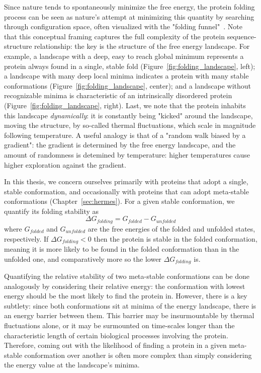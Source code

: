 Since nature tends to spontaneously minimize the free energy, the protein folding process can be seen as nature's attempt
at minimizing this quantity by searching through configuration space, often visualized with the "folding funnel"~\citep{onuchic_theory_1997}.
Note that this conceptual framing captures the full complexity of the protein sequence-structure relationship:
the key is the structure of the free energy landscape.
For example, a landscape with a deep, easy to reach global minimum represents a protein always found in a single, stable fold (Figure~\ref{fig:folding_landscape}, left);
a landscape with many deep local minima indicates a protein with many stable conformations (Figure~\ref{fig:folding_landscape}, center);
and a landscape without recognizable minima is characteristic of an intrinsically disordered protein (Figure~\ref{fig:folding_landscape}, right).
Last, we note that the protein inhabits this landscape \textit{dynamically}:
it is constantly being "kicked" around the landscape, moving the structure, by so-called thermal
fluctuations, which scale in magnitude following temperature.
A useful analogy is that of a "random walk biased by a gradient": the gradient is determined by the free energy landscape, and the amount
of randomness is detemined by temperature: higher temperatures cause higher exploration against the gradient.

In this thesis, we concern ourselves primarily with proteins that adopt a single, stable conformation, and occasionally with
proteins that can adopt meta-stable conformations (Chapter~\ref{sec:hermes}).
For a given stable conformation, we quantify its folding stability as
\begin{equation}
    \Delta G_{folding} = G_{folded} - G_{unfolded}
\end{equation}
where $G_{folded}$ and $G_{unfolded}$ are the free energies of the folded and unfolded states, respectively.
If $\Delta G_{folding} < 0$ then the protein is stable in the folded conformation, meaning it is more likely to be found in 
the folded conformation than in the unfolded one, and comparatively more so the lower $\Delta G_{folding}$ is.

Quantifying the relative stability of two meta-stable conformations can be done analogously by considering their relative energy:
the conformation with lowest energy should be the most likely to find the protein in.
However, there is a key subtlety: since both conformations sit at minima of the energy landscape, there is an energy barrier
between them. This barrier may be insurmountable by thermal fluctuations alone, or it may be surmounted
on time-scales longer than the characteristic length of certain biological processes involving the protein.
Therefore, coming out with the likelihood of finding a protein in a given meta-stable conformation over another
is often more complex than simply considering the energy value at the landscape's minima.

